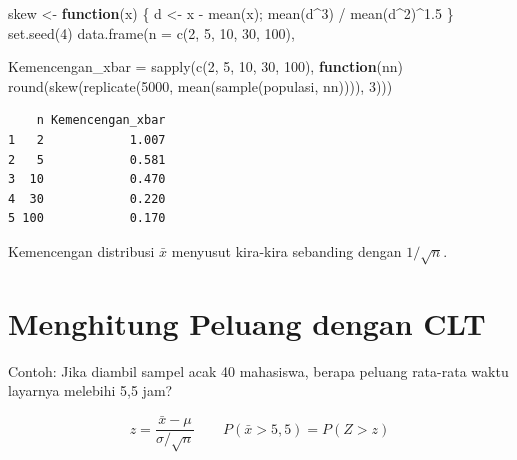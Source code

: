 \documentclass[
  indonesian,
  letterpaper,
]{book}
\newenvironment{Shaded}{\begin{snugshade}}{\end{snugshade}}
\newcommand{\AttributeTok}[1]{\textcolor[rgb]{0.40,0.45,0.13}{#1}}
\newcommand{\ControlFlowTok}[1]{\textcolor[rgb]{0.00,0.23,0.31}{\textbf{#1}}}
\newcommand{\DecValTok}[1]{\textcolor[rgb]{0.68,0.00,0.00}{#1}}
\newcommand{\FloatTok}[1]{\textcolor[rgb]{0.68,0.00,0.00}{#1}}
\newcommand{\FunctionTok}[1]{\textcolor[rgb]{0.28,0.35,0.67}{#1}}
\newcommand{\NormalTok}[1]{\textcolor[rgb]{0.00,0.23,0.31}{#1}}
\newcommand{\OtherTok}[1]{\textcolor[rgb]{0.00,0.23,0.31}{#1}}
\newcommand{\SpecialCharTok}[1]{\textcolor[rgb]{0.37,0.37,0.37}{#1}}
\begin{document}
\begin{Shaded}
\begin{Highlighting}[]
\NormalTok{skew }\OtherTok{\textless{}{-}} \ControlFlowTok{function}\NormalTok{(x) \{ d }\OtherTok{\textless{}{-}}\NormalTok{ x }\SpecialCharTok{{-}} \FunctionTok{mean}\NormalTok{(x); }\FunctionTok{mean}\NormalTok{(d}\SpecialCharTok{\^{}}\DecValTok{3}\NormalTok{) }\SpecialCharTok{/} \FunctionTok{mean}\NormalTok{(d}\SpecialCharTok{\^{}}\DecValTok{2}\NormalTok{)}\SpecialCharTok{\^{}}\FloatTok{1.5}\NormalTok{ \}}
\FunctionTok{set.seed}\NormalTok{(}\DecValTok{4}\NormalTok{)}
\FunctionTok{data.frame}\NormalTok{(}\AttributeTok{n =} \FunctionTok{c}\NormalTok{(}\DecValTok{2}\NormalTok{, }\DecValTok{5}\NormalTok{, }\DecValTok{10}\NormalTok{, }\DecValTok{30}\NormalTok{, }\DecValTok{100}\NormalTok{),}

\AttributeTok{Kemencengan\_xbar =} \FunctionTok{sapply}\NormalTok{(}\FunctionTok{c}\NormalTok{(}\DecValTok{2}\NormalTok{, }\DecValTok{5}\NormalTok{, }\DecValTok{10}\NormalTok{, }\DecValTok{30}\NormalTok{, }\DecValTok{100}\NormalTok{), }\ControlFlowTok{function}\NormalTok{(nn)}
\FunctionTok{round}\NormalTok{(}\FunctionTok{skew}\NormalTok{(}\FunctionTok{replicate}\NormalTok{(}\DecValTok{5000}\NormalTok{, }\FunctionTok{mean}\NormalTok{(}\FunctionTok{sample}\NormalTok{(populasi, nn)))), }\DecValTok{3}\NormalTok{)))}
\end{Highlighting}
\end{Shaded}

\begin{verbatim}
    n Kemencengan_xbar
1   2            1.007
2   5            0.581
3  10            0.470
4  30            0.220
5 100            0.170
\end{verbatim}

Kemencengan distribusi \(\bar{x}\) menyusut kira-kira sebanding dengan
\(1/\sqrt{n}\).

\section{Menghitung Peluang dengan
CLT}\label{menghitung-peluang-dengan-clt}

Contoh: Jika diambil sampel acak 40 mahasiswa, berapa peluang rata-rata
waktu layarnya melebihi 5,5 jam?

\[z = \dfrac{\bar{x} - \mu}{\sigma/\sqrt{n}} \qquad P(\bar{x} > 5{,}5) = P(Z > z)\]
\end{document}
